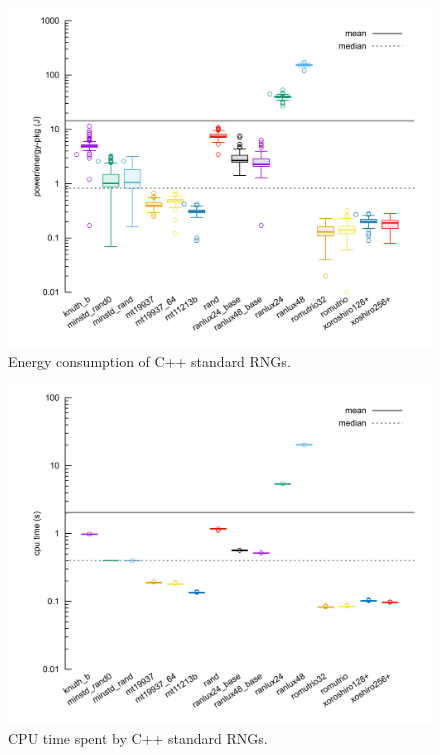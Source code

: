 \documentclass[dvipsnames,format=sigconf,anonymous=true,review=true]{acmart}
\begin{document}
\begin{figure}
\centering
\includegraphics[width=\linewidth]{pkg.png}
\caption{Energy consumption of C++ standard RNGs.}
\label{fig:pkg}
\end{figure}

\begin{figure}
\centering
\includegraphics[width=\linewidth]{cpu.png}
\caption{CPU time spent by C++ standard RNGs.}
\label{fig:cpu}
\end{figure}

\end{document}
